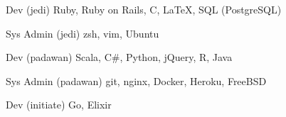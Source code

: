 
\begin{cvskills}

  \cvskill
    {Dev (jedi)} %
    {Ruby, Ruby on Rails, C, LaTeX, SQL (PostgreSQL)} %

  \cvskill
    {Sys Admin (jedi)} %
    {zsh, vim, Ubuntu} %

  \cvskill
    {Dev (padawan)} %
    {Scala, C\#, Python, jQuery, R, Java} %

  \cvskill
    {Sys Admin (padawan)} %
    {git, nginx, Docker, Heroku, FreeBSD} %

  \cvskill
    {Dev (initiate)} %
    {Go, Elixir} %
\end{cvskills}
